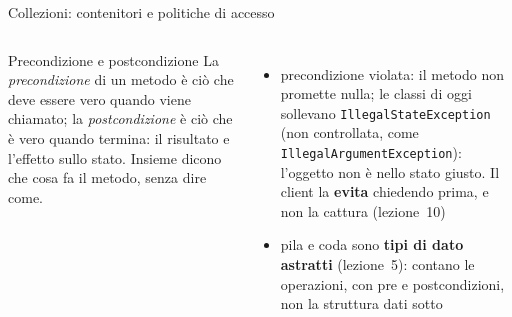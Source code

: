 \documentclass[10pt,aspectratio=169,xcolor={table}]{beamer}
\begin{document}
\begin{frame}[fragile]{Collezioni: contenitori e politiche di accesso}
\begin{columns}[T]
\begin{block}{Precondizione e postcondizione}
\small La \emph{precondizione} di un metodo è ciò che deve essere vero quando viene chiamato; la \emph{postcondizione} è ciò che è vero quando termina: il risultato e l'effetto sullo stato. Insieme dicono che cosa fa il metodo, senza dire come.
\end{block}
\footnotesize
\begin{itemize}\itemsep=3pt
    \item precondizione violata: il metodo non promette nulla; le classi di oggi sollevano \texttt{IllegalStateException} (non controllata, come \texttt{IllegalArgumentException}): l'oggetto non è nello stato giusto. Il client la \textbf{evita} chiedendo prima, e non la cattura (lezione~10)
    \item pila e coda sono \textbf{tipi di dato astratti} (lezione~5): contano le operazioni, con pre e postcondizioni, non la struttura dati sotto
\end{itemize}
\end{columns}
\end{frame}
\end{document}
